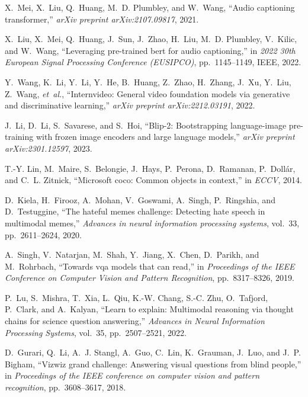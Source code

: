 \begin{thebibliography}{10}
X.~Mei, X.~Liu, Q.~Huang, M.~D. Plumbley, and W.~Wang, ``Audio captioning
  transformer,'' {\em arXiv preprint arXiv:2107.09817}, 2021.

X.~Liu, X.~Mei, Q.~Huang, J.~Sun, J.~Zhao, H.~Liu, M.~D. Plumbley, V.~Kilic,
  and W.~Wang, ``Leveraging pre-trained bert for audio captioning,'' in {\em
  2022 30th European Signal Processing Conference (EUSIPCO)}, pp.~1145--1149,
  IEEE, 2022.

Y.~Wang, K.~Li, Y.~Li, Y.~He, B.~Huang, Z.~Zhao, H.~Zhang, J.~Xu, Y.~Liu,
  Z.~Wang, {\em et~al.}, ``Internvideo: General video foundation models via
  generative and discriminative learning,'' {\em arXiv preprint
  arXiv:2212.03191}, 2022.

J.~Li, D.~Li, S.~Savarese, and S.~Hoi, ``Blip-2: Bootstrapping language-image
  pre-training with frozen image encoders and large language models,'' {\em
  arXiv preprint arXiv:2301.12597}, 2023.

T.-Y. Lin, M.~Maire, S.~Belongie, J.~Hays, P.~Perona, D.~Ramanan,
  P.~Doll{\'a}r, and C.~L. Zitnick, ``Microsoft coco: Common objects in
  context,'' in {\em ECCV}, 2014.

D.~Kiela, H.~Firooz, A.~Mohan, V.~Goswami, A.~Singh, P.~Ringshia, and
  D.~Testuggine, ``The hateful memes challenge: Detecting hate speech in
  multimodal memes,'' {\em Advances in neural information processing systems},
  vol.~33, pp.~2611--2624, 2020.

A.~Singh, V.~Natarjan, M.~Shah, Y.~Jiang, X.~Chen, D.~Parikh, and M.~Rohrbach,
  ``Towards vqa models that can read,'' in {\em Proceedings of the IEEE
  Conference on Computer Vision and Pattern Recognition}, pp.~8317--8326, 2019.

P.~Lu, S.~Mishra, T.~Xia, L.~Qiu, K.-W. Chang, S.-C. Zhu, O.~Tafjord, P.~Clark,
  and A.~Kalyan, ``Learn to explain: Multimodal reasoning via thought chains
  for science question answering,'' {\em Advances in Neural Information
  Processing Systems}, vol.~35, pp.~2507--2521, 2022.

D.~Gurari, Q.~Li, A.~J. Stangl, A.~Guo, C.~Lin, K.~Grauman, J.~Luo, and J.~P.
  Bigham, ``Vizwiz grand challenge: Answering visual questions from blind
  people,'' in {\em Proceedings of the IEEE conference on computer vision and
  pattern recognition}, pp.~3608--3617, 2018.


\end{thebibliography}
